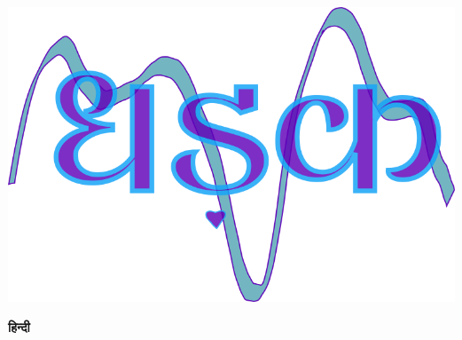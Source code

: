 \documentclass[10pt,a4paper]{article}
\begin{document}
	
	\begin{titlepage}
		\vspace*{5cm}
		{\centering
			
			\includegraphics[width=1\textwidth]{../common/logo.png}\par
		}
		\vspace{4cm}
		\hfil \Large\bfseries हिन्दी \hfil
		\vfill
	\end{titlepage}
	
	
	\tableofcontents
	\pagebreak
	
		
	
	
	
	
	\pagebreak
	
\end{document}
